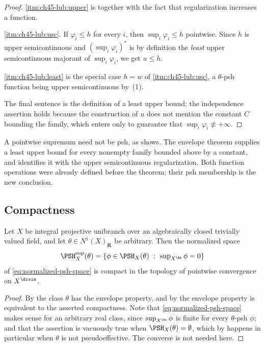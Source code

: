 \begin{proof}
\cref{itm:ch45-lub:upper} is  together with the
fact that regularization increases a function.

\cref{itm:ch45-lub:usc}.  If $\varphi_i\le h$ for every $i$, then
$\sup_i\varphi_i\le h$ pointwise.  Since $h$ is upper semicontinuous and
$(\sup_i\varphi_i)^*$ is by definition the \emph{least} upper
semicontinuous majorant of $\sup_i\varphi_i$, we get $u\le h$.

\cref{itm:ch45-lub:least} is the special case $h=w$ of
\cref{itm:ch45-lub:usc}, a $\theta$-psh function being upper
semicontinuous by \,(1).

The final sentence is the definition of a least upper bound; the
independence assertion holds because the construction of $u$ does not
mention the constant $C$ bounding the family, which enters only to
guarantee that $\sup_i\varphi_i\not\equiv+\infty$.
\end{proof}

\begin{remark}
\label{rem:ch45-lub-not-naive}
A pointwise supremum need not be psh, as
 shows.  The envelope theorem supplies a
least upper bound for every nonempty family bounded above by a constant,
and identifies it with the upper semicontinuous regularization.  Both
function operations were already defined before the theorem; their psh
membership is the new conclusion.
\end{remark}

\subsection{Compactness}
\label{sec:ch45-compactness}

\begin{corollary}
\label{cor:ch45-compactness}
Let $X$ be integral projective unibranch over an algebraically closed
trivially valued field, and let $\theta\in N^1(X)_{\mathbf R}$ be
arbitrary.  Then the normalized space
\[
 \PSH_X^{\sup}(\theta)
 =\{\phi\in\PSH_X(\theta)\ :\ \textstyle\sup_{X^{\An}}\phi=0\}
\]
of \eqref{eq:normalized-psh-space} is compact in the topology of pointwise
convergence on $X^{\divis}$.
\end{corollary}

\begin{proof}
By  the class $\theta$ has the envelope
property, and by  the envelope property
is equivalent to the asserted compactness.  Note that
\eqref{eq:normalized-psh-space} makes sense for an arbitrary real class,
since $\sup_{X^{\An}}\phi$ is finite for every $\theta$-psh $\phi$;
and that the assertion is vacuously true when $\PSH_X(\theta)=\emptyset$,
which by  happens in particular when $\theta$
is not pseudoeffective.  The converse is not needed here.
\end{proof}

